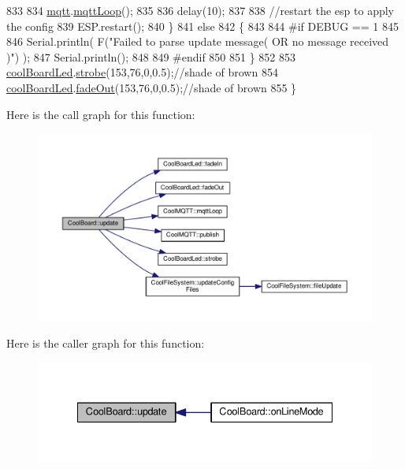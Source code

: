\begin{DoxyCode}
833             
834             \hyperlink{classCoolBoard_a2399f44d7c23c1149a335cb3b46d90f1}{mqtt}.\hyperlink{classCoolMQTT_aa5eaae967b562b62cbcf2b8d81f6e5d5}{mqttLoop}();
835 
836             delay(10);
837             
838             \textcolor{comment}{//restart the esp to apply the config}
839             ESP.restart();
840     \}
841     \textcolor{keywordflow}{else}
842     \{
843     
844 \textcolor{preprocessor}{    #if DEBUG == 1}
845 
846         Serial.println( F(\textcolor{stringliteral}{"Failed to parse update message( OR no message received )"}) );
847         Serial.println();
848     
849 \textcolor{preprocessor}{    #endif}
850     
851     \}
852 
853     \hyperlink{classCoolBoard_a1b1d3c684a5baa56b08486e192fd8e97}{coolBoardLed}.\hyperlink{classCoolBoardLed_ad5f0de4c628cbfbf49896042831c64ad}{strobe}(153,76,0,0.5);\textcolor{comment}{//shade of brown}
854     \hyperlink{classCoolBoard_a1b1d3c684a5baa56b08486e192fd8e97}{coolBoardLed}.\hyperlink{classCoolBoardLed_a93d545679237e8cc858324367149775c}{fadeOut}(153,76,0,0.5);\textcolor{comment}{//shade of brown                              }
855 \}
\end{DoxyCode}
Here is the call graph for this function\+:\nopagebreak
\begin{figure}[H]
\begin{center}
\leavevmode
\includegraphics[width=350pt]{classCoolBoard_a8612756d3f73198cdde857a66f0fe690_cgraph}
\end{center}
\end{figure}
Here is the caller graph for this function\+:\nopagebreak
\begin{figure}[H]
\begin{center}
\leavevmode
\includegraphics[width=335pt]{classCoolBoard_a8612756d3f73198cdde857a66f0fe690_icgraph}
\end{center}
\end{figure}
\mbox{\label{classCoolBoard_ae7358fb6e623cfc81b775f5f1734909b}} 
